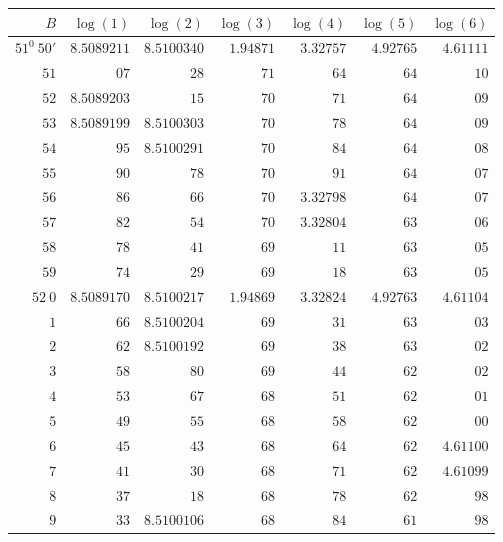 \clearpage
{}
\begingroup
\fontsize{8}{9}\selectfont
\setlength{\tabcolsep}{5pt}
\renewcommand{\arraystretch}{1.09}
\begin{center}
\begin{tabular}{||r||r|r|r|r|r|r||}
\hline\hline
\(B\)&\(\log(1)\)&\(\log(2)\)&\(\log(3)\)&\(\log(4)\)&\(\log(5)\)&\(\log(6)\)\\
\hline
\(51^0\ 50'\) & \(8.5089211\) & \(8.5100340\) & \(1.94871\) & \(3.32757\) & \(4.92765\) & \(4.61111\)\\
\(51\) & \(07\) & \(28\) & \(71\) & \(64\) & \(64\) & \(10\)\\
\(52\) & \(8.5089203\) & \(15\) & \(70\) & \(71\) & \(64\) & \(09\)\\
\(53\) & \(8.5089199\) & \(8.5100303\) & \(70\) & \(78\) & \(64\) & \(09\)\\
\(54\) & \(95\) & \(8.5100291\) & \(70\) & \(84\) & \(64\) & \(08\)\\
\(55\) & \(90\) & \(78\) & \(70\) & \(91\) & \(64\) & \(07\)\\
\(56\) & \(86\) & \(66\) & \(70\) & \(3.32798\) & \(64\) & \(07\)\\
\(57\) & \(82\) & \(54\) & \(70\) & \(3.32804\) & \(63\) & \(06\)\\
\(58\) & \(78\) & \(41\) & \(69\) & \(11\) & \(63\) & \(05\)\\
\(59\) & \(74\) & \(29\) & \(69\) & \(18\) & \(63\) & \(05\)\\[3pt]
\(52\ 0\) & \(8.5089170\) & \(8.5100217\) & \(1.94869\) & \(3.32824\) & \(4.92763\) & \(4.61104\)\\
\(1\) & \(66\) & \(8.5100204\) & \(69\) & \(31\) & \(63\) & \(03\)\\
\(2\) & \(62\) & \(8.5100192\) & \(69\) & \(38\) & \(63\) & \(02\)\\
\(3\) & \(58\) & \(80\) & \(69\) & \(44\) & \(62\) & \(02\)\\
\(4\) & \(53\) & \(67\) & \(68\) & \(51\) & \(62\) & \(01\)\\
\(5\) & \(49\) & \(55\) & \(68\) & \(58\) & \(62\) & \(00\)\\
\(6\) & \(45\) & \(43\) & \(68\) & \(64\) & \(62\) & \(4.61100\)\\
\(7\) & \(41\) & \(30\) & \(68\) & \(71\) & \(62\) & \(4.61099\)\\
\(8\) & \(37\) & \(18\) & \(68\) & \(78\) & \(62\) & \(98\)\\
\(9\) & \(33\) & \(8.5100106\) & \(68\) & \(84\) & \(61\) & \(98\)\\[3pt]

\end{tabular}
\end{center}
